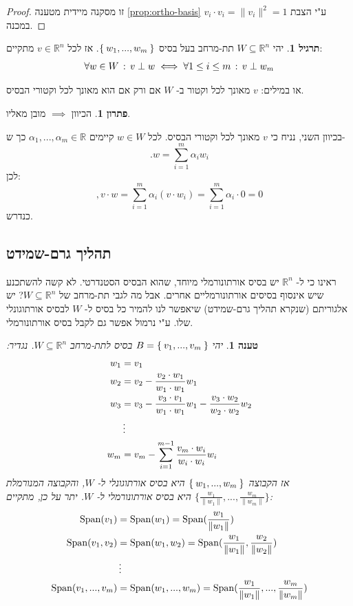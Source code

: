 \documentclass[12pt]{report}
\theoremstyle{plain}
\newtheorem{proposition}[theorem]{טענה}
\theoremstyle{definition}
\newtheorem{exercise}{תרגיל}[chapter]
\newtheorem*{solution}{פתרון}
\newcommand{\R}{\mathbb{R}}
\newcommand{\0}{\mathbf{0}}
\DeclareMathOperator{\Span}{Span}
\begin{document}
\begin{proof}
זו מסקנה מיידית מטענה
\ref{prop:ortho-basis}
ע"י הצבת
$v_i\cdot v_i=\|v_i\|^2=1$
במכנה.
\end{proof}

\begin{exercise}\label{exer:orthogonal-by-basis}
יהי
$W\subseteq\R^n$
תת-מרחב בעל בסיס 
$\Set{w_1,...,w_m}$.
אז לכל
$v\in\R^n$
מתקיים:
$$
\forall w\in W\thinspace :\thinspace v\perp w \iff \forall 1\leq i\leq m \thinspace :\thinspace v\perp w_m
$$

או במילים: 
$v$
מאונך לכל וקטור ב-
$W$
אם ורק אם הוא מאונך לכל וקטורי הבסיס.
\end{exercise}

\begin{solution}
הכיוון
$\implies$
מובן מאליו.

בכיוון השני, נניח כי
$v$
מאונך לכל וקטורי הבסיס. לכל 
$w\in W$
קיימים
$\alpha_1,...,\alpha_m\in\R$
כך ש-
$$
.w=\sum_{i=1}^m\alpha_i w_i
$$
לכן:
$$
,v\cdot w=\sum_{i=1}^m\alpha_i (v\cdot w_i)=\sum_{i=1}^m \alpha_i\cdot 0=0
$$
כנדרש.

\end{solution}

\subsection{תהליך גרם-שמידט}

ראינו כי ל-
$\R^n$
יש בסיס אורתונורמלי מיוחד, שהוא הבסיס הסטנדרטי. לא קשה להשתכנע שיש אינסוף בסיסים אורתונורמליים אחרים. אבל מה לגבי תת-מרחב של
$W\subseteq\R^n$? 
יש אלגוריתם (שנקרא תהליך גרם-שמידט) שיאפשר לנו להמיר כל בסיס ל-
$W$
לבסיס אורתוגונלי שלו. ע"י נרמול אפשר גם לקבל בסיס אורתונורמלי.

\begin{proposition}
יהי
$B=\Set{v_1,...,v_m}$
בסיס לתת-מרחב
$W\subseteq \R^n$.
נגדיר:
$$ 
\begin{aligned} w_1&=v_1 \\ 
w_2&=v_2-\frac{v_2\cdot w_1}{w_1\cdot w_1}w_1 \\ 
w_3&=v_3-\frac{v_3\cdot v_1}{w_1\cdot w_1}w_1-\frac{v_3\cdot w_2}{w_2\cdot w_2}w_2\\ 
&\thinspace \vdots \\ 
w_m&=v_m-\sum_{i=1}^{m-1}\frac{v_m\cdot w_i}{w_i\cdot w_i}w_i 
\end{aligned}
$$
אז הקבוצה
$\Set{w_1,...,w_m}$
היא בסיס אורתוגונלי ל-
$W$,
והקבוצה המנורמלת
$\{\frac{w_1}{\|w_1\|},...,\frac{w_m}{\|w_m\|}\}$
היא בסיס אורתונורמלי ל-
$W$.
יתר על כן, מתקיים:
$$ 
\begin{aligned} 
\Span(v_1)&=\Span(w_1)=\Span(\frac{w_1}{\|w_1\|}) \\ \Span(v_1,v_2)&=\Span(w_1,w_2)=\Span(\frac{w_1}{\|w_1\|},\frac{w_2}{\|w_2\|}) \\ &\thinspace\vdots \\ \Span(v_1,...,v_m)&=\Span(w_1,...,w_m)=\Span(\frac{w_1}{\|w_1\|},...,\frac{w_m}{\|w_m\|}) \end{aligned} 
$$ 
\end{proposition}
\end{document}

